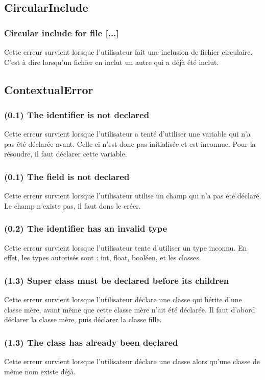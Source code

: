 \documentclass[12pt, a4paper, one side]{article}
\begin{document}
    \subsection{CircularInclude}
    \subsubsection{Circular include for file [...]}
    Cette erreur survient lorsque l'utilisateur fait une inclusion de fichier circulaire. C'est à dire lorsqu'un fichier en inclut un autre qui a déjà été inclut.


    \subsection{ContextualError}
    \subsubsection{(0.1) The identifier is not declared}
    Cette erreur survient lorsque l'utilisateur a tenté d'utiliser une variable qui n'a pas été déclarée avant. Celle-ci n'est donc
    pas initialisée et est inconnue. Pour la résoudre, il faut déclarer cette variable.

    \subsubsection{(0.1) The field is not declared}
    Cette erreur survient lorsque l'utilisateur utilise un champ qui n'a pas été déclaré. Le champ n'existe pas, il faut donc le créer.

    \subsubsection{(0.2) The identifier has an invalid type}
    Cette erreur survient lorsque l'utilisateur tente d'utiliser un type inconnu. En effet, les types autorisés sont : int, float, booléen, et les classes.

    \subsubsection{(1.3) Super class must be declared before its children}
    Cette erreur survient lorsque l'utilisateur déclare une classe qui hérite d'une classe mère, avant même que cette classe mère n'ait été déclarée. Il faut d'abord déclarer la classe mère, puis déclarer la classe fille.

    \subsubsection{(1.3) The class has already been declared}
    Cette erreur survient lorsque l'utilisateur déclare une classe alors qu'une classe de même nom existe déjà.
\end{document}
